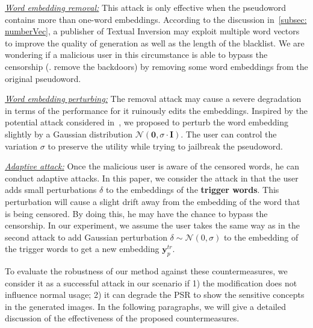 \begin{packeditemize}
    \item  \textit{\ul{Word embedding removal:}} This attack is only effective when the pseudoword contains more than one-word embeddings. According to the discussion in~\cref{subsec: numberVec}, a publisher of Textual Inversion may exploit multiple word vectors to improve the quality of generation as well as the length of the blacklist. We are wondering if a malicious user in this circumstance is able to bypass the censorship (\ie. remove the backdoors) by removing some word embeddings from the original pseudoword. 
    
    \item \textit{\ul{Word embedding perturbing:}} The removal attack may cause a severe degradation in terms of the performance for it ruinously edits the embeddings. Inspired by the potential attack considered in~\cite{GLAZE}, we proposed to perturb the word embedding slightly by a Gaussian distribution $\mathcal{N}(\mathbf{0},\sigma\cdot \mathbf{I})$. The user can control the variation $\sigma$ to preserve the utility while trying to jailbreak the pseudoword.
    
    \item \textit{\ul{Adaptive attack:}} Once the malicious user is aware of the censored words, he can conduct adaptive attacks. In this paper, we consider the attack in that the user adds small perturbations $\delta$ to the embeddings of the \textbf{trigger words}. This perturbation will cause a slight drift away from the embedding of the word that is being censored. By doing this, he may have the chance to bypass the censorship. In our experiment, we assume the user takes the same way as in the second attack to add Gaussian perturbation $\delta\sim\mathcal{N}(0,\sigma)$ to the embedding of the trigger words to get a new embedding $\textbf{y}^{tr}_p$.
\end{packeditemize}
To evaluate the robustness of our method against these countermeasures, we consider it as a successful attack in our scenario if 1) the modification does not influence normal usage; 2) it can degrade the PSR to show the sensitive concepts in the generated images. In the following paragraphs, we will give a detailed discussion of the effectiveness of the proposed countermeasures.

